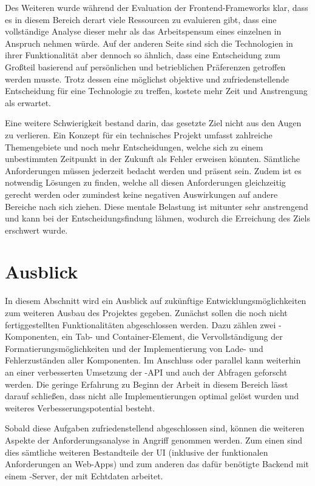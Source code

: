 Des Weiteren wurde während der Evaluation der Frontend-Frameworks klar, dass es in diesem Bereich derart viele Ressourcen zu evaluieren gibt, dass eine vollständige Analyse dieser mehr als das Arbeitspensum eines einzelnen in Anspruch nehmen würde. Auf der anderen Seite sind sich die Technologien in ihrer Funktionalität aber dennoch so ähnlich, dass eine Entscheidung zum Großteil basierend auf persönlichen und betrieblichen Präferenzen getroffen werden musste. Trotz dessen eine möglichst objektive und zufriedenstellende Entscheidung für eine Technologie zu treffen, kostete mehr Zeit und Anstrengung als erwartet.

Eine weitere Schwierigkeit bestand darin, das gesetzte Ziel nicht aus den Augen zu verlieren. Ein Konzept für ein technisches Projekt umfasst zahlreiche Themengebiete und noch mehr Entscheidungen, welche sich zu einem unbestimmten Zeitpunkt in der Zukunft als Fehler erweisen könnten. Sämtliche Anforderungen müssen jederzeit bedacht werden und präsent sein. Zudem ist es notwendig Lösungen zu finden, welche all diesen Anforderungen gleichzeitig gerecht werden oder zumindest keine negativen Auswirkungen auf andere Bereiche nach sich ziehen. Diese mentale Belastung ist mitunter sehr anstrengend und kann bei der Entscheidungsfindung lähmen, wodurch die Erreichung des Ziels erschwert wurde.

\section{Ausblick}
In diesem Abschnitt wird ein Ausblick auf zukünftige Entwicklungsmöglichkeiten zum weiteren Ausbau des Projektes gegeben. Zunächst sollen die noch nicht fertiggestellten Funktionalitäten abgeschlossen werden. Dazu zählen zwei -Komponenten, ein Tab- und Container-Element, die Vervollständigung der Formatierungsmöglichkeiten und der Implementierung von Lade- und Fehlerzuständen aller Komponenten.
Im Anschluss oder parallel kann weiterhin an einer verbesserten Umsetzung der -API und auch der Abfragen geforscht werden. Die geringe Erfahrung zu Beginn der Arbeit in diesem Bereich lässt darauf schließen, dass nicht alle Implementierungen optimal gelöst wurden und weiteres Verbesserungspotential besteht.

Sobald diese Aufgaben zufriedenstellend abgeschlossen sind, können die weiteren Aspekte der Anforderungsanalyse in Angriff genommen werden. Zum einen sind dies sämtliche weiteren Bestandteile der UI (inklusive der funktionalen Anforderungen an Web-Apps) und zum anderen das dafür benötigte Backend mit einem -Server, der mit Echtdaten arbeitet.
